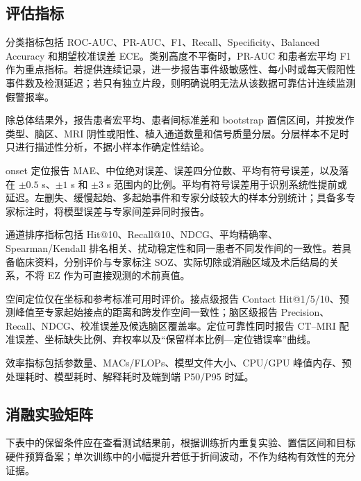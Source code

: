 \subsection{评估指标}

分类指标包括 ROC-AUC、PR-AUC、F1、Recall、Specificity、Balanced Accuracy 和期望校准误差 ECE。类别高度不平衡时，PR-AUC 和患者宏平均 F1 作为重点指标。若提供连续记录，进一步报告事件级敏感性、每小时或每天假阳性事件数及检测延迟；若只有独立片段，则明确说明无法从该数据可靠估计连续监测假警报率。

除总体结果外，报告患者宏平均、患者间标准差和 bootstrap 置信区间，并按发作类型、脑区、MRI 阴性或阳性、植入通道数量和信号质量分层。分层样本不足时只进行描述性分析，不据小样本作确定性结论。

onset 定位报告 MAE、中位绝对误差、误差四分位数、平均有符号误差，以及落在 $\pm0.5$ s、$\pm1$ s 和 $\pm3$ s 范围内的比例。平均有符号误差用于识别系统性提前或延迟。左删失、缓慢起始、多起始事件和专家分歧较大的样本分别统计；具备多专家标注时，将模型误差与专家间差异同时报告。

通道排序指标包括 Hit@10、Recall@10、NDCG、平均精确率、Spearman/Kendall 排名相关、扰动稳定性和同一患者不同发作间的一致性。若具备临床资料，分别评价与专家标注 SOZ、实际切除或消融区域及术后结局的关系，不将 EZ 作为可直接观测的术前真值。

空间定位仅在坐标和参考标准可用时评价。接点级报告 Contact Hit@1/5/10、预测峰值至专家起始接点的距离和跨发作空间一致性；脑区级报告 Precision、Recall、NDCG、校准误差及候选脑区覆盖率。定位可靠性同时报告 CT--MRI 配准误差、坐标缺失比例、弃权率以及“保留样本比例—定位错误率”曲线。

效率指标包括参数量、MACs/FLOPs、模型文件大小、CPU/GPU 峰值内存、预处理耗时、模型耗时、解释耗时及端到端 P50/P95 时延。

\subsection{消融实验矩阵}

下表中的保留条件应在查看测试结果前，根据训练折内重复实验、置信区间和目标硬件预算备案；单次训练中的小幅提升若低于折间波动，不作为结构有效性的充分证据。

